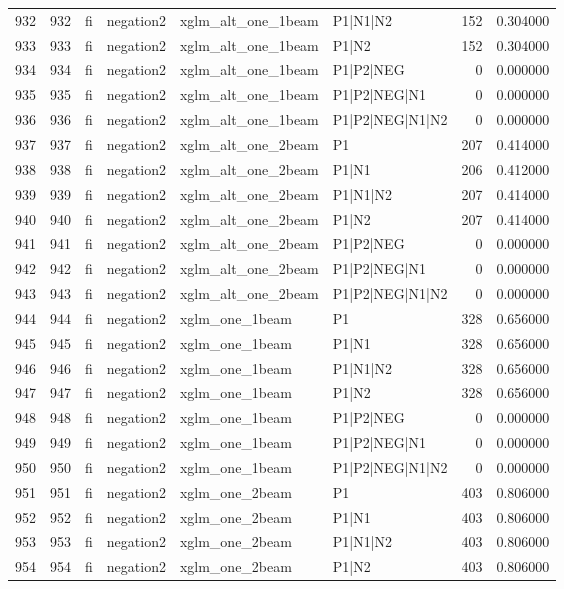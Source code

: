 \begin{tabular}{lrllllrr}
932 & 932 & fi & negation2 & xglm_alt_one_1beam & P1|N1|N2 & 152 & 0.304000 \\
933 & 933 & fi & negation2 & xglm_alt_one_1beam & P1|N2 & 152 & 0.304000 \\
934 & 934 & fi & negation2 & xglm_alt_one_1beam & P1|P2|NEG & 0 & 0.000000 \\
935 & 935 & fi & negation2 & xglm_alt_one_1beam & P1|P2|NEG|N1 & 0 & 0.000000 \\
936 & 936 & fi & negation2 & xglm_alt_one_1beam & P1|P2|NEG|N1|N2 & 0 & 0.000000 \\
937 & 937 & fi & negation2 & xglm_alt_one_2beam & P1 & 207 & 0.414000 \\
938 & 938 & fi & negation2 & xglm_alt_one_2beam & P1|N1 & 206 & 0.412000 \\
939 & 939 & fi & negation2 & xglm_alt_one_2beam & P1|N1|N2 & 207 & 0.414000 \\
940 & 940 & fi & negation2 & xglm_alt_one_2beam & P1|N2 & 207 & 0.414000 \\
941 & 941 & fi & negation2 & xglm_alt_one_2beam & P1|P2|NEG & 0 & 0.000000 \\
942 & 942 & fi & negation2 & xglm_alt_one_2beam & P1|P2|NEG|N1 & 0 & 0.000000 \\
943 & 943 & fi & negation2 & xglm_alt_one_2beam & P1|P2|NEG|N1|N2 & 0 & 0.000000 \\
944 & 944 & fi & negation2 & xglm_one_1beam & P1 & 328 & 0.656000 \\
945 & 945 & fi & negation2 & xglm_one_1beam & P1|N1 & 328 & 0.656000 \\
946 & 946 & fi & negation2 & xglm_one_1beam & P1|N1|N2 & 328 & 0.656000 \\
947 & 947 & fi & negation2 & xglm_one_1beam & P1|N2 & 328 & 0.656000 \\
948 & 948 & fi & negation2 & xglm_one_1beam & P1|P2|NEG & 0 & 0.000000 \\
949 & 949 & fi & negation2 & xglm_one_1beam & P1|P2|NEG|N1 & 0 & 0.000000 \\
950 & 950 & fi & negation2 & xglm_one_1beam & P1|P2|NEG|N1|N2 & 0 & 0.000000 \\
951 & 951 & fi & negation2 & xglm_one_2beam & P1 & 403 & 0.806000 \\
952 & 952 & fi & negation2 & xglm_one_2beam & P1|N1 & 403 & 0.806000 \\
953 & 953 & fi & negation2 & xglm_one_2beam & P1|N1|N2 & 403 & 0.806000 \\
954 & 954 & fi & negation2 & xglm_one_2beam & P1|N2 & 403 & 0.806000 \\

\end{tabular}
